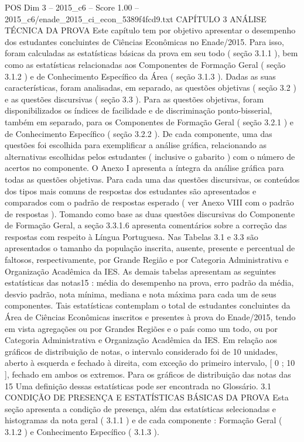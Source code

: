 \begin{textsample}{POS Dim 3 – 2015\_c6 – Score 1.00 – 2015\_c6/enade\_2015\_ci\_econ\_5389f4fcd9.txt}  \label{ex:f3_pos_215}
CAPÍTULO 3 ANÁLISE TÉCNICA DA PROVA Este capítulo tem por objetivo apresentar o desempenho dos estudantes concluintes de Ciências Econômicas no Enade/2015.
Para isso, foram calculadas as estatísticas básicas da prova em seu todo ( seção 3.1.1 ), bem como as estatísticas relacionadas aos Componentes de Formação Geral ( seção 3.1.2 ) e de Conhecimento Específico da Área ( seção 3.1.3 ).
Dadas as suas características, foram analisadas, em separado, as questões objetivas ( seção 3.2 ) e as questões discursivas ( seção 3.3 ).
Para as questões objetivas, foram disponibilizados os índices de facilidade e de discriminação ponto-bisserial, também em separado, para os Componentes de Formação Geral ( seção 3.2.1 ) e de Conhecimento Específico ( seção 3.2.2 ).
De cada componente, uma das questões foi escolhida para exemplificar a análise gráfica, relacionando as alternativas escolhidas pelos estudantes ( inclusive o gabarito ) com o número de acertos no componente.
O Anexo I apresenta a íntegra da análise gráfica para todas as questões objetivas.
Para cada uma das questões discursivas, os conteúdos dos tipos mais comuns de respostas dos estudantes são apresentados e comparados com o padrão de respostas esperado ( ver Anexo VIII com o padrão de respostas ).
Tomando como base as duas questões discursivas do Componente de Formação Geral, a seção 3.3.1.6 apresenta comentários sobre a correção das respostas com respeito à Língua Portuguesa.
Nas Tabelas 3.1 e 3.3 são apresentados o tamanho da população inscrita, ausente, presente e percentual de faltosos, respectivamente, por Grande Região e por Categoria Administrativa e Organização Acadêmica da IES.
As demais tabelas apresentam as seguintes estatísticas das notas15 : média do desempenho na prova, erro padrão da média, desvio padrão, nota mínima, mediana e nota máxima para cada um de seus componentes.
Tais estatísticas contemplam o total de estudantes concluintes da Área de Ciências Econômicas inscritos e presentes à prova do Enade/2015, tendo em vista agregações ou por Grandes Regiões e o país como um todo, ou por Categoria Administrativa e Organização Acadêmica da IES.
Em relação aos gráficos de distribuição de notas, o intervalo considerado foi de 10 unidades, aberto à esquerda e fechado à direita, com exceção do primeiro intervalo, [ 0 ; 10 ], fechado em ambos os extremos.
Para os gráficos de distribuição das notas das 15 Uma definição dessas estatísticas pode ser encontrada no Glossário. 3.1 CONDIÇÃO DE PRESENÇA E ESTATÍSTICAS BÁSICAS DA PROVA Esta seção apresenta a condição de presença, além das estatísticas selecionadas e histogramas da nota geral ( 3.1.1 ) e de cada componente : Formação Geral ( 3.1.2 ) e Conhecimento Específico ( 3.1.3 ).

\end{textsample}
